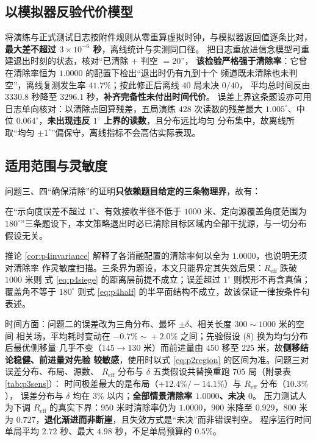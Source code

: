 \documentclass[withoutpreface, bwprint]{cumcmthesis}
\begin{document}
\subsection{以模拟器反验代价模型}
\label{sec:replay}

将演练与正式测试日志按附件规则从零重算虚拟时钟，与模拟器返回值逐条比对，\textbf{最大差不超过
$3\times10^{-6}$ 秒}，离线统计与实测同口径。
把日志重放进信念模型可重建退出时刻的状态，核对“已清除 $+$ 判空 $=20$”，
\textbf{该检验严格强于清除率}：它曾在清除率恒为 $1.0000$ 的配置下检出“退出时仍有九到十个
频道既未清除也未判空”，离线复测发生率 $41.7\%$；按此修正后离线 $40$ 局未决 $0/40$，
平均总时间反由 $3330.8$ 秒降至 $3296.1$ 秒，\textbf{补齐完备性未付出时间代价}。
误差上界这条题设亦可用日志单向核对：以清除点回算残差，五局演练 $428$ 次读数的残差最大
$1.005^\circ$、中位 $0.064^\circ$，\textbf{未出现违反 $1^\circ$ 上界的读数}，且分布远比均匀
分布集中，故离线所取“均匀 $\pm1^\circ$”偏保守，离线指标不会高估实际表现。

\subsection{适用范围与灵敏度}

问题三、四“确保清除”的证明\textbf{只依赖题目给定的三条物理界}，故有：

\begin{corollary}[清除率的不变性]
\label{cor:p4invariance}
在“示向度误差不超过 $1^\circ$、有效接收半径不低于 $1000$ 米、定向源覆盖角度范围为
$180^\circ$”三条题设下，本文策略退出时必已清除目标区域内全部干扰源，与一切分布假设无关。
\end{corollary}

推论 \ref{cor:p4invariance} 解释了各消融配置的清除率何以全为 $1.0000$，也说明无须对清除率
作灵敏度扫描。三条界为题设，本文只能界定其失效后果：$R_{\mathrm{eff}}$ 跌破 $1000$ 米则
式 \eqref{eq:p4siege} 的距离层前提不成立；误差超过 $1^\circ$ 则楔形不再含真值；
覆盖角不等于 $180^\circ$ 则式 \eqref{eq:p4half} 的半平面结构不成立，故该保证一律按条件句表述。

时间方面：问题二的误差改为三角分布、最坏 $\pm\delta$、相关长度 $300\!\sim\!1000$ 米的空间
相关场，平均耗时变动在 $-0.7\%\!\sim\!+2.0\%$ 之间；先验假设 (8) 换为均匀分布后最优侧移量
几乎不变（$145\to130$ 米）而前进量由 $450$ 移至 $225$ 米，故\textbf{侧移结论稳健、前进量对先验
较敏感}，使用时以式 \eqref{eq:p2region} 的区间为准。问题三对误差分布、布局、源数、
$R_{\mathrm{eff}}$ 分布与 $\delta$ 五类假设共替换重跑 $705$ 局（附录表 \ref{tab:p3sens}）：
时间极差最大的是布局（$+12.4\%/-14.1\%$）与 $R_{\mathrm{eff}}$ 分布（$10.3\%$），
误差分布与 $\delta$ 均在 $3\%$ 以内；\textbf{全部情景清除率 $1.0000$、未决 $0$}。
压力测试人为下调 $R_{\mathrm{eff}}$ 的真实下界：$950$ 米时清除率仍为 $1.0000$，$900$ 米降至
$0.929$，$800$ 米为 $0.727$，\textbf{退化渐进而非断崖}，且失效方式是“未决”而非错误判空。
程序运行时间单局平均 $2.72$ 秒、最大 $4.98$ 秒，不足单局预算的 $0.5\%$。
\end{document}
